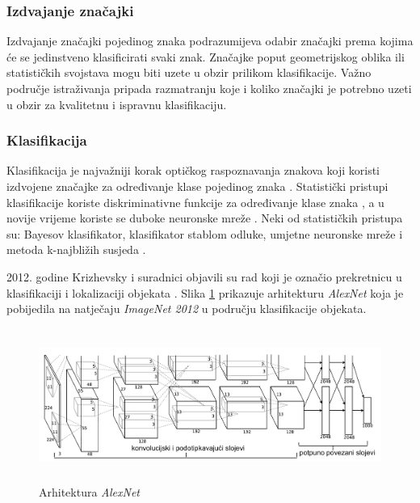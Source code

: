 \documentclass[times, utf8, zavrsni]{fer}
\begin{document}
\subsubsection{Izdvajanje značajki}

Izdvajanje značajki pojedinog znaka podrazumijeva odabir značajki prema kojima će
se jedinstveno klasificirati svaki znak. Značajke poput geometrijskog oblika ili
statističkih svojstava mogu biti uzete u obzir prilikom klasifikacije. Važno područje istraživanja pripada
razmatranju koje i koliko značajki je potrebno uzeti u obzir za kvalitetnu i ispravnu
klasifikaciju. \citep{DBLP:journals/corr/abs-1710-05703}

\subsubsection{Klasifikacija}

Klasifikacija je najvažniji korak optičkog raspoznavanja znakova \citep{verma2012survey} \citep{zhu2016novel}
koji koristi izdvojene značajke za određivanje klase pojedinog znaka \citep{lehal1999feature} \citep{kaur2016survey}.
Statistički pristupi klasifikacije koriste diskriminativne funkcije za određivanje klase znaka \citep{DBLP:journals/corr/abs-1710-05703},
a u novije vrijeme koriste se duboke neuronske mreže \citep{Jurin:2017:Master}.
Neki od statističkih pristupa su: Bayesov klasifikator, klasifikator stablom odluke, umjetne neuronske mreže i
metoda k-najbližih susjeda \citep{DBLP:journals/corr/abs-1710-05703}.

2012. godine Krizhevsky i suradnici \citep{krizhevsky2012imagenet} objavili su rad koji je
označio prekretnicu u klasifikaciji i lokalizaciji objekata \citep{Jurin:2017:Master}. Slika
\ref{fig:deep-example-01} prikazuje arhitekturu \emph{AlexNet} koja je pobijedila na natječaju
\emph{ImageNet 2012} u području klasifikacije objekata. \citep{Jurin:2017:Master}

\begin{figure}[htb]
    \centering
    \includegraphics[height=5cm]{images/deep-example-01.png}
    \caption{Arhitektura \emph{AlexNet} \citep{Jurin:2017:Master}}
    \label{fig:deep-example-01}
\end{figure}
\end{document}

